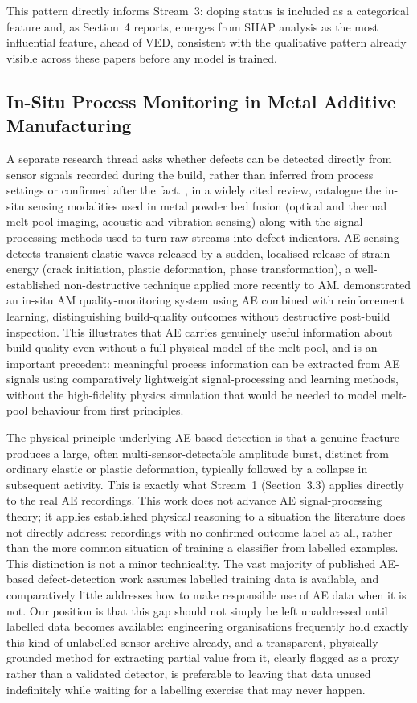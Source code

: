 \documentclass[a4paper]{article}
\begin{document}
This pattern directly informs Stream~3: doping status is included as a categorical feature and, as Section~4 reports, emerges from SHAP analysis as the most influential feature, ahead of VED, consistent with the qualitative pattern already visible across these papers before any model is trained.

\subsection{In-Situ Process Monitoring in Metal Additive Manufacturing}
A separate research thread asks whether defects can be detected directly from sensor signals recorded during the build, rather than inferred from process settings or confirmed after the fact. \citet{grasso2017}, in a widely cited review, catalogue the in-situ sensing modalities used in metal powder bed fusion (optical and thermal melt-pool imaging, acoustic and vibration sensing) along with the signal-processing methods used to turn raw streams into defect indicators. AE sensing detects transient elastic waves released by a sudden, localised release of strain energy (crack initiation, plastic deformation, phase transformation), a well-established non-destructive technique applied more recently to AM. \citet{wasmer2019} demonstrated an in-situ AM quality-monitoring system using AE combined with reinforcement learning, distinguishing build-quality outcomes without destructive post-build inspection. This illustrates that AE carries genuinely useful information about build quality even without a full physical model of the melt pool, and is an important precedent: meaningful process information can be extracted from AE signals using comparatively lightweight signal-processing and learning methods, without the high-fidelity physics simulation that would be needed to model melt-pool behaviour from first principles.

The physical principle underlying AE-based detection is that a genuine fracture produces a large, often multi-sensor-detectable amplitude burst, distinct from ordinary elastic or plastic deformation, typically followed by a collapse in subsequent activity. This is exactly what Stream~1 (Section~3.3) applies directly to the real AE recordings. This work does not advance AE signal-processing theory; it applies established physical reasoning to a situation the literature does not directly address: recordings with no confirmed outcome label at all, rather than the more common situation of training a classifier from labelled examples. This distinction is not a minor technicality. The vast majority of published AE-based defect-detection work assumes labelled training data is available, and comparatively little addresses how to make responsible use of AE data when it is not. Our position is that this gap should not simply be left unaddressed until labelled data becomes available: engineering organisations frequently hold exactly this kind of unlabelled sensor archive already, and a transparent, physically grounded method for extracting partial value from it, clearly flagged as a proxy rather than a validated detector, is preferable to leaving that data unused indefinitely while waiting for a labelling exercise that may never happen.
\end{document}
